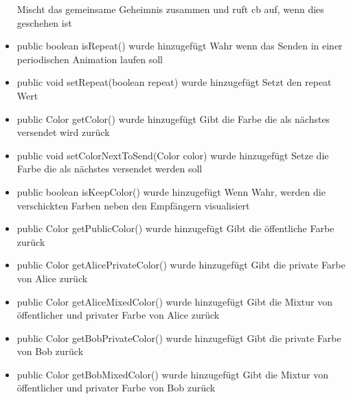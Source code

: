 \documentclass{article}
\begin{document}
\begin{itemize}
               Mischt das gemeinsame Geheimnis zusammen und ruft cb auf, wenn dies geschehen ist
           \item public boolean isRepeat() wurde hinzugefügt\newline
               Wahr wenn das Senden in einer periodischen Animation laufen soll
           \item public void setRepeat(boolean repeat) wurde hinzugefügt\newline
               Setzt den repeat Wert
           \item public Color getColor() wurde hinzugefügt\newline
               Gibt die Farbe die als nächstes versendet wird zurück
           \item public void setColorNextToSend(Color color) wurde hinzugefügt\newline
               Setze die Farbe die als nächstes versendet werden soll
           \item public boolean isKeepColor() wurde hinzugefügt\newline
               Wenn Wahr, werden die verschickten Farben neben den Empfängern visualisiert
           \item public Color getPublicColor() wurde hinzugefügt\newline
               Gibt die öffentliche Farbe zurück
           \item public Color getAlicePrivateColor() wurde hinzugefügt\newline
               Gibt die private Farbe von Alice zurück
           \item public Color getAliceMixedColor() wurde hinzugefügt\newline
               Gibt die Mixtur von öffentlicher und privater Farbe von Alice zurück
           \item public Color getBobPrivateColor() wurde hinzugefügt\newline
               Gibt die private Farbe von Bob zurück
           \item public Color getBobMixedColor() wurde hinzugefügt\newline
               Gibt die Mixtur von öffentlicher und privater Farbe von Bob zurück
           \end{itemize}
\end{document}
